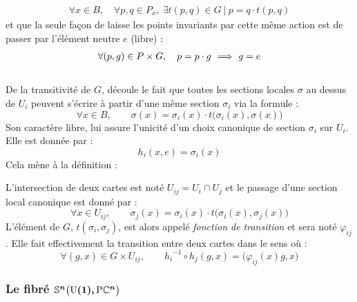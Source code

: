 \begin{align*}
	\forall x\in B,\quad \forall p,q\in P_x,\ \exists t(p,q)\in G\ |\ p = q\cdot t(p,q) 
\end{align*}
et que la seule façon de laisse les points invariants par cette même action est de passer par l'élément neutre $e$ (libre) :
\begin{align*}
	\forall (p,g)\in P\times G,\quad p = p\cdot g\ \Longrightarrow\ g=e
\end{align*}
\\
De la transitivité de $G$, découle le fait que toutes les sections locales $\sigma$ au dessus de $U_i$ peuvent s'écrire à partir d'une même section $\sigma_i$ via la formule :
\[\forall x\in B,\qquad \sigma(x) = \sigma_i(x) \cdot t\big(\sigma_i(x), \sigma(x)\big)\]
Son caractère libre, lui assure l'unicité d'un choix canonique de section $\sigma_i$ sur $U_i$. Elle est donnée par :
\[{h_i}(x,e) = \sigma_i(x)\]
Cela mène à la définition :
\begin{definition}
	L'intersection de deux cartes  est noté $U_{ij} = U_i\cap U_j$ et le passage d'une section local canonique est donné par :
	\[\forall x\in U_{ij},\qquad \sigma_j(x) = \sigma_i(x) \cdot t\big(\sigma_i(x), \sigma_j(x)\big)\]
	L'élément de $G$, $t(\sigma_i, \sigma_j)$, est alors appelé \emph{fonction de transition} et sera noté $\varphi_{ij}$. Elle fait effectivement la transition entre deux cartes dans le sens où :
	\[\forall (g,x)\in G\times U_{ij},\qquad {h_i}^{-1} \circ h_j(g,x) = \big( \varphi_{ij}(x)g, x \big)\]
\end{definition}
\skipl




\subsubsection{Le fibré $\boldsymbol{\mathbb{ S}^{n}\big(\text{\normalfont U}(1),\text{\normalfont P}\mathbb{C}^{n}\big)}$}\label{subsec:SUPC_VFP}

